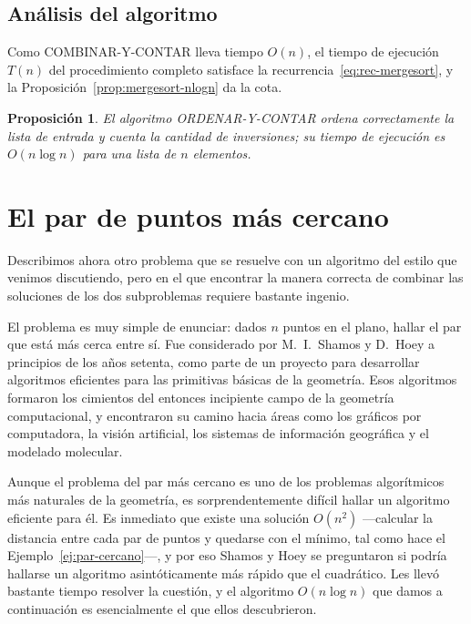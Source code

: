\documentclass[12pt, spanish, oneside, openany]{book}
\newcommand{\alg}[1]{#1}
\theoremstyle{uprightplain}
\newtheorem{proposicion}[teorema]{Proposición}
\theoremstyle{definition}
\theoremstyle{remark}
\theoremstyle{definition}
\begin{document}
\subsection{Análisis del algoritmo}

Como \alg{COMBINAR-Y-CONTAR} lleva tiempo $O(n)$, el tiempo de ejecución $T(n)$ del procedimiento completo satisface la recurrencia~\eqref{eq:rec-mergesort}, y la Proposición~\ref{prop:mergesort-nlogn} da la cota.

\begin{proposicion}
\label{prop:inversiones-nlogn}
El algoritmo \alg{ORDENAR-Y-CONTAR} ordena correctamente la lista de entrada y cuenta la cantidad de inversiones; su tiempo de ejecución es $O(n\log n)$ para una lista de $n$ elementos.
\end{proposicion}


\section{El par de puntos más cercano}
\label{sec:par-cercano-dv}

Describimos ahora otro problema que se resuelve con un algoritmo del estilo que venimos discutiendo, pero en el que encontrar la manera correcta de combinar las soluciones de los dos subproblemas requiere bastante ingenio.

El problema es muy simple de enunciar: dados $n$ puntos en el plano, hallar el par que está más cerca entre sí. Fue considerado por M.~I.~Shamos y D.~Hoey a principios de los años setenta, como parte de un proyecto para desarrollar algoritmos eficientes para las primitivas básicas de la geometría. Esos algoritmos formaron los cimientos del entonces incipiente campo de la geometría computacional, y encontraron su camino hacia áreas como los gráficos por computadora, la visión artificial, los sistemas de información geográfica y el modelado molecular.

Aunque el problema del par más cercano es uno de los problemas algorítmicos más naturales de la geometría, es sorprendentemente difícil hallar un algoritmo eficiente para él. Es inmediato que existe una solución $O(n^2)$ ---calcular la distancia entre cada par de puntos y quedarse con el mínimo, tal como hace el Ejemplo~\ref{ej:par-cercano}---, y por eso Shamos y Hoey se preguntaron si podría hallarse un algoritmo asintóticamente más rápido que el cuadrático. Les llevó bastante tiempo resolver la cuestión, y el algoritmo $O(n\log n)$ que damos a continuación es esencialmente el que ellos descubrieron.
\end{document}
